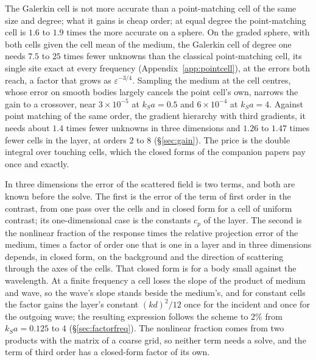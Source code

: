 \documentclass[11pt,a4paper]{article}
\begin{document}
The Galerkin cell is not more accurate than a point-matching cell of the same size and degree; what it
gains is cheap order; at equal degree the point-matching cell is $1.6$ to $1.9$ times the more accurate on
a sphere. On the graded sphere, with both cells given the cell mean of the medium, the Galerkin cell of
degree one needs $7.5$ to $25$ times fewer unknowns than the classical point-matching cell, its single site
exact at every frequency (Appendix~\ref{app:pointcell}), at the errors both reach, a factor that grows as
$\varepsilon^{-3/4}$. Sampling the medium at the cell centres, whose error on smooth bodies largely cancels
the point cell's own, narrows the gain to a crossover, near $3\times10^{-5}$ at $k_Sa=0.5$ and
$6\times10^{-4}$ at $k_Sa=4$. Against point matching of the same order, the
gradient hierarchy with third gradients, it needs about $1.4$ times fewer unknowns in three dimensions and
$1.26$ to $1.47$ times fewer cells in the layer, at orders $2$ to $8$ (\S\ref{sec:gain}). The price is
the double integral over touching cells, which the closed forms of the companion papers pay once and
exactly.

In three dimensions the error of the scattered field is two terms, and both are known before the solve.
The first is the error of the term of first order in the contrast, from one pass over the cells and in
closed form for a cell of uniform contrast; its one-dimensional case is the constants $c_p$ of the layer.
The second is the nonlinear fraction of the response times the relative projection error of the medium,
times a factor of order one that is one in a layer and in three dimensions depends, in closed form, on the
background and the direction of scattering through the axes of the cells. That closed form is for a body
small against the wavelength. At a finite frequency a cell loses the slope of the product of medium and
wave, so the wave's slope stands beside the medium's, and for constant cells the factor gains the layer's
constant $(kd)^2/12$ once for the incident and once for the outgoing wave; the resulting expression
follows the scheme to $2\%$ from $k_Sa=0.125$ to $4$ (\S\ref{sec:factorfreq}). The nonlinear fraction comes
from two products with the matrix of a coarse grid, so neither term needs a solve, and the term of third
order has a closed-form factor of its own.
\end{document}
